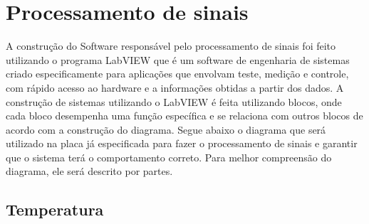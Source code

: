 \section{Processamento de sinais}

A construção do Software responsável pelo processamento de sinais foi feito utilizando o programa LabVIEW que é um software de engenharia de sistemas criado especificamente para aplicações que envolvam teste, medição e controle, com rápido acesso ao hardware e a informações obtidas a partir dos dados.
A construção de sistemas utilizando o LabVIEW é feita utilizando blocos, onde cada bloco desempenha uma função específica e se relaciona com outros blocos de acordo com a construção do diagrama.
Segue abaixo o diagrama que será utilizado na placa já especificada para fazer o processamento de sinais e garantir que o sistema terá o comportamento correto. Para melhor compreensão do diagrama, ele será descrito por partes.

\subsection{Temperatura}

